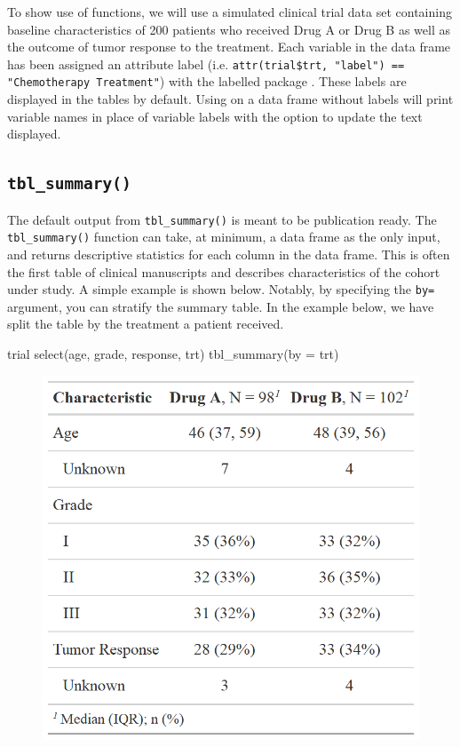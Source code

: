 To show use of  functions, we will use a simulated clinical trial data set containing baseline characteristics of 200 patients who received Drug A or Drug B as well as the outcome of tumor response to the treatment.
Each variable in the data frame has been assigned an attribute label (i.e. \texttt{attr(trial\$trt, "label") == "Chemotherapy Treatment"}) with the labelled package \citep{labelled}. 
These labels are displayed in the  tables by default. Using  on a data frame without labels will print variable names in place of variable labels with the option to update the text displayed.



\subsection{\texorpdfstring{\texttt{tbl\_summary()}}{tbl\_summary()}}

The default output from \texttt{tbl\_summary()} is meant to be publication ready.
The \texttt{tbl\_summary()} function can take, at minimum, a data frame as the only input, and returns descriptive statistics for each column in the data frame.
This is often the first table of clinical manuscripts and describes characteristics of the cohort under study.
A simple example is shown below.
Notably, by specifying the \texttt{by=} argument, you can stratify the summary table. 
In the example below, we have split the table by the treatment a patient received. 

\begin{example}
trial %
  select(age, grade, response, trt) %
  tbl_summary(by = trt)
\end{example}
\begin{figure}[h!]
  \includegraphics[scale=0.28]{summary_basic.png}
  \centering
\end{figure}

